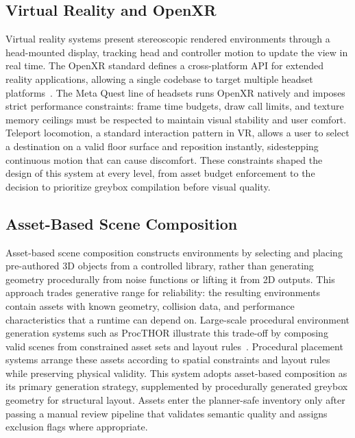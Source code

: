 \documentclass[12pt]{article}
\begin{document}
\subsection{Virtual Reality and OpenXR}
Virtual reality systems present stereoscopic rendered environments through a head-mounted display, tracking head and controller motion to update the view in real time. The OpenXR standard defines a cross-platform API for extended reality applications, allowing a single codebase to target multiple headset platforms~\cite{Khronos_OpenXR_Spec}. The Meta Quest line of headsets runs OpenXR natively and imposes strict performance constraints: frame time budgets, draw call limits, and texture memory ceilings must be respected to maintain visual stability and user comfort. Teleport locomotion, a standard interaction pattern in VR, allows a user to select a destination on a valid floor surface and reposition instantly, sidestepping continuous motion that can cause discomfort. These constraints shaped the design of this system at every level, from asset budget enforcement to the decision to prioritize greybox compilation before visual quality.

\subsection{Asset-Based Scene Composition}
Asset-based scene composition constructs environments by selecting and placing pre-authored 3D objects from a controlled library, rather than generating geometry procedurally from noise functions or lifting it from 2D outputs. This approach trades generative range for reliability: the resulting environments contain assets with known geometry, collision data, and performance characteristics that a runtime can depend on. Large-scale procedural environment generation systems such as ProcTHOR illustrate this trade-off by composing valid scenes from constrained asset sets and layout rules~\cite{Deitke_2022_NeurIPS}. Procedural placement systems arrange these assets according to spatial constraints and layout rules while preserving physical validity. This system adopts asset-based composition as its primary generation strategy, supplemented by procedurally generated greybox geometry for structural layout. Assets enter the planner-safe inventory only after passing a manual review pipeline that validates semantic quality and assigns exclusion flags where appropriate.
\end{document}
